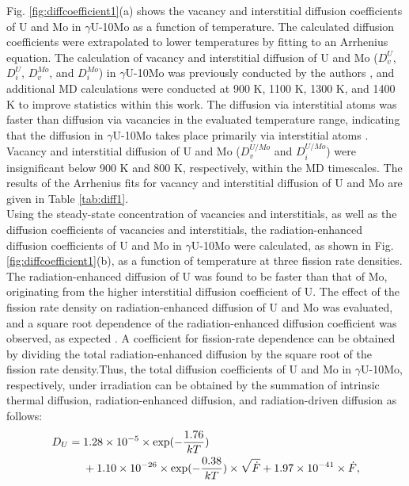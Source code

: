 \documentclass[preprint,12pt]{elsarticle}
\begin{document}
\indent Fig. \ref{fig:diffcoefficient1}(a) shows the vacancy and interstitial diffusion coefficients of U and Mo in $\gamma$U-10Mo as a function of temperature. The calculated diffusion coefficients were extrapolated to lower temperatures by fitting to an Arrhenius equation. The calculation of vacancy and interstitial diffusion of U and Mo ($D^{U}_{v}$, $D^{U}_{i}$, $D^{Mo}_{v}$, and $D^{Mo}_{i}$) in $\gamma$U-10Mo was previously conducted by the authors \cite{park2021atomistic}, and additional MD calculations were conducted at 900 K, 1100 K, 1300 K, and 1400 K to improve statistics within this work. The diffusion via interstitial atoms was faster than diffusion via vacancies in the evaluated temperature range, indicating that the diffusion in $\gamma$U-10Mo takes place primarily via interstitial atoms \cite{park2021atomistic, smirnova2015atomistic}. Vacancy and interstitial diffusion of U and Mo ($D^{U/Mo}_{v}$ and $D^{U/Mo}_{i}$) were insignificant below 900 K and 800 K, respectively, within the MD timescales. The results of the Arrhenius fits for vacancy and interstitial diffusion of U and Mo are given in Table \ref{tab:diff1}.\\
\indent Using the steady-state concentration of vacancies and interstitials, as well as the diffusion coefficients of vacancies and interstitials, the radiation-enhanced diffusion coefficients of U and Mo in $\gamma$U-10Mo were calculated, as shown in Fig. \ref{fig:diffcoefficient1}(b), as a function of temperature at three fission rate densities. The radiation-enhanced diffusion of U was found to be faster than that of Mo, originating from the higher interstitial diffusion coefficient of U. The effect of the fission rate density on radiation-enhanced diffusion of U and Mo was evaluated, and a square root dependence of the radiation-enhanced diffusion coefficient was observed, as expected \cite{cooper2021irradiation, matthews2020cluster}. A coefficient for fission-rate dependence can be obtained by dividing the total radiation-enhanced diffusion by the square root of the fission rate density.Thus, the total diffusion coefficients of U and Mo in $\gamma$U-10Mo, respectively, under irradiation can be obtained by the summation of intrinsic thermal diffusion, radiation-enhanced diffusion, and radiation-driven diffusion as follows:
\\

\begin{align} 
D_{U}={}& 1.28\times10^{-5}\times \mbox{exp}(-\frac{1.76}{kT}) \\ 
&+1.10\times10^{-26}\times \mbox{exp}(-\frac{0.38}{kT})\times \sqrt{\dot{F}} + 1.97\times10^{-41}\times \dot{F}, \notag
\end{align}
\end{document}
